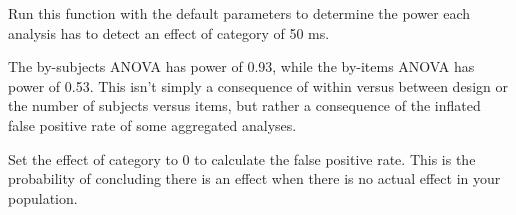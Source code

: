 \documentclass[man,floatsintext]{apa6}
\newenvironment{Shaded}{\begin{snugshade}}{\end{snugshade}}
\newcommand{\CommentTok}[1]{\textcolor[rgb]{0.56,0.35,0.01}{\textit{#1}}}
\newcommand{\DataTypeTok}[1]{\textcolor[rgb]{0.13,0.29,0.53}{#1}}
\newcommand{\DecValTok}[1]{\textcolor[rgb]{0.00,0.00,0.81}{#1}}
\newcommand{\FloatTok}[1]{\textcolor[rgb]{0.00,0.00,0.81}{#1}}
\newcommand{\KeywordTok}[1]{\textcolor[rgb]{0.13,0.29,0.53}{\textbf{#1}}}
\newcommand{\NormalTok}[1]{#1}
\newcommand{\OperatorTok}[1]{\textcolor[rgb]{0.81,0.36,0.00}{\textbf{#1}}}
\newcommand{\StringTok}[1]{\textcolor[rgb]{0.31,0.60,0.02}{#1}}
\begin{document}
Run this function with the default parameters to determine the power each analysis has to detect an effect of category of 50 ms.

\begin{Shaded}
\end{Shaded}

The by-subjects ANOVA has power of 0.93, while the by-items ANOVA has power of 0.53. This isn't simply a consequence of within versus between design or the number of subjects versus items, but rather a consequence of the inflated false positive rate of some aggregated analyses.

Set the effect of category to 0 to calculate the false positive rate. This is the probability of concluding there is an effect when there is no actual effect in your population.

\begin{Shaded}
\end{Shaded}
\end{document}
